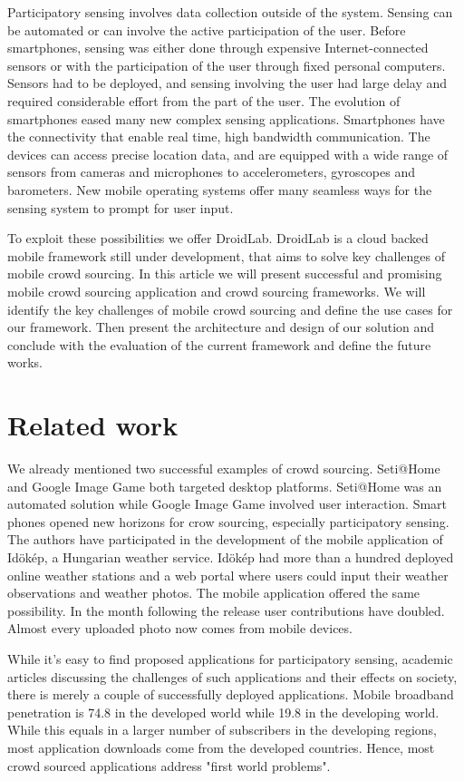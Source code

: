 \documentclass[conference,letterpaper]{IEEEtran}
\begin{document}
Participatory sensing involves data collection outside of the system. Sensing can be automated or can involve the active participation of the user. Before smartphones, sensing was either done through expensive Internet-connected sensors or with the participation of the user through fixed personal computers. Sensors had to be deployed, and sensing involving the user had large delay and required considerable effort from the part of the user. The evolution of smartphones eased many new complex sensing applications. Smartphones have the connectivity that enable real time, high bandwidth communication. The devices can access precise location data, and are equipped with a wide range of sensors from cameras and microphones to accelerometers, gyroscopes and barometers. New mobile operating systems offer many seamless ways for the sensing system to prompt for user input.

To exploit these possibilities we offer DroidLab. DroidLab is a cloud backed mobile framework still under development, that aims to solve key challenges of mobile crowd sourcing. In this article we will present successful and promising mobile crowd sourcing application and crowd sourcing frameworks. We will identify the key challenges of mobile crowd sourcing and define the use cases for our framework. Then present the architecture and design of our solution and conclude with the evaluation of the current framework and define the future works.
\section{Related work}
\label{sec:related_work}
We already mentioned two successful examples of crowd sourcing. Seti@Home and Google Image Game both targeted desktop platforms. Seti@Home was an automated solution while Google Image Game involved user interaction. Smart phones opened new horizons for crow sourcing, especially participatory sensing. The authors have participated in the development of the mobile application of Id\"ok\'ep, a Hungarian weather service. Id\"ok\'ep had more than a hundred deployed online weather stations and a web portal where users could input their weather observations and weather photos. The mobile application offered the same possibility. In the month following the release user contributions have doubled. Almost every uploaded photo now comes from mobile devices.

While it's easy to find proposed applications for participatory sensing, academic articles discussing the challenges of such applications and their effects on society, there is merely a couple of successfully deployed applications. Mobile broadband penetration is 74.8 in the developed world while 19.8 in the developing world. While this equals in a larger number of subscribers in the developing regions, most application downloads come from the developed countries. Hence, most crowd sourced applications address "first world problems".
\end{document}
